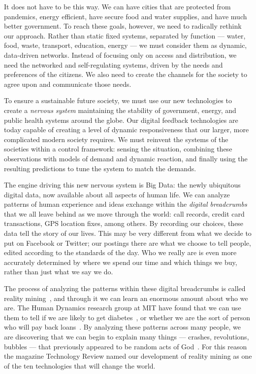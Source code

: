 It does not have to be this way.
We can have cities that are protected from pandemics, energy efficient, have secure food and water supplies, and have much better government.
To reach these goals, however, we need to radically rethink our approach.
Rather than static fixed systems, separated by function --- water, food, waste, transport, education, energy --- we must consider them as dynamic, data-driven networks.
Instead of focusing only on access and distribution, we need the networked and self-regulating systems, driven by the needs and preferences of the citizens.
We also need to create the channels for the society to agree upon and communicate those needs. 

To ensure a sustainable future society, we must use our new technologies to create a \emph{nervous system} maintaining the stability of government, energy, and public health systems around the globe.
Our digital feedback technologies are today capable of creating a level of dynamic responsiveness that our larger, more complicated modern society requires.
We must reinvent the systems of the societies within a control framework: sensing the situation, combining these observations with models of demand and dynamic reaction, and finally using the resulting predictions to tune the system to match the demands.

The engine driving this new nervous system is Big Data: the newly ubiquitous digital data, now available about all aspects of human life.
We can analyze patterns of human experience and ideas exchange within the \emph{digital breadcrumbs} that we all leave behind as we move through the world: call records, credit card transactions, GPS location fixes, among others.
By recording our choices, these data tell the story of our lives.
This may be very different from what we decide to put on Facebook or Twitter; our postings there are what we choose to tell people, edited according to the standards of the day.
Who we really are is even more accurately determined by where we spend our time and which things we buy, rather than just what we say we do.

The process of analyzing the patterns within these digital breadcrumbs is called reality mining~\cite{eagle2006reality,pentland2009reality}, and through it we can learn an enormous amount about who we are.
The Human Dynamics research group at MIT have found that we can use them to tell if we are likely to get diabetes~\cite{pentland2009using}, or whether we are the sort of person who will pay back loans~\cite{singh2013classifying}.
By analyzing these patterns across many people, we are discovering that we can begin to explain many things --- crashes, revolutions, bubbles --- that previously appeared to be random acts of God~\cite{pan2012decoding}.
For this reason the magazine Technology Review named our development of reality mining as one of the ten technologies that will change the world\cite{greene2008reality}. 

